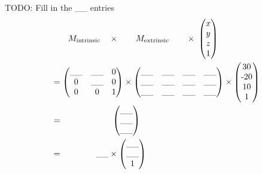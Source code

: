 \begin{enumerate}[(a)]
\begin{enumerate} [(i)]
\begin{tcolorbox}[colback=white!5!white,colframe=green!75!black]
{{    TODO: Fill in the \_\_ entries
    \begin{align*}
        & \qquad M_{\text{intrinsic}} \quad \times \qquad M_{\text{extrinsic}} \qquad  \times \; 
        \begin{pmatrix} 
            x  \\ 
            y  \\ 
            z  \\
            1
        \end{pmatrix} \\
        &= \begin{pmatrix} 
        \_\_ & \_\_ & $0$    \\  %
        $0$ & \_\_ & $0$     \\  %
        $0$ & $0$ & $1$ 
        \end{pmatrix} 
        \times
        \begin{pmatrix} 
        \_\_ & \_\_ & \_\_ & \_\_  \\ %
        \_\_ & \_\_ & \_\_ & \_\_  \\ %
        \_\_ & \_\_ & \_\_ & \_\_     %
        \end{pmatrix} \times
        \begin{pmatrix} 
        $30$    \\ 
        $-20$   \\ 
        $10$    \\ 
        $1$ \end{pmatrix} \\
        &= \qquad \qquad \qquad \begin{pmatrix} 
        \_\_    \\   %
        \_\_    \\   %
        \_\_         %
        \end{pmatrix} \\
        &= \qquad \quad \quad 
        \_\_         %
        \times 
        \begin{pmatrix}  
        \_\_    \\   %
        \_\_    \\   %
        $1$ 
        \end{pmatrix}
    \end{align*}

}}
\end{tcolorbox}
\end{enumerate}
\end{enumerate}
